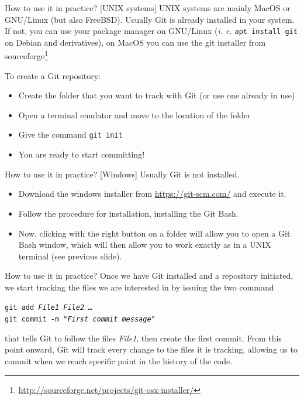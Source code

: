 \documentclass{beamer}
\newcommand{\git}{Git{}}
\newcommand{\cd}[1]{\texttt{#1}}
\begin{document}
\begin{frame}{How to use it in practice? [UNIX systems]}
    UNIX systems are mainly MacOS or GNU/Linux (but also FreeBSD). Usually \git{} is already installed in your system. If not, you can use your package manager on GNU/Linux (\emph{i. e.} \cd{apt install git} on Debian and derivatives), on MacOS you can use the git installer from sourceforge\footnote{\url{http://sourceforge.net/projects/git-osx-installer/}}
    \begin{block}{To create a \git{} repository:}
        \begin{itemize}
        \justifying
            \item Create the folder that you want to track with \git{} (or use one already in use)
            \item Open a terminal emulator and move to the location of the folder
            \item Give the command \cd{git init}
            \item You are ready to start committing!
        \end{itemize}
    \end{block}
\end{frame}

\begin{frame}{How to use it in practice? [Windows]}
    Usually \git{} is not installed. 
    \begin{itemize}
    \justifying
        \item Download the windows installer from \url{https://git-scm.com/} and execute it.
        \item Follow the procedure for installation, installing the Git Bash.
        \item Now, clicking with the right button on a folder will allow you to open a Git Bash window, which will then allow you to work exactly as in a UNIX terminal (see previous slide).
    \end{itemize}
\end{frame}

\begin{frame}{How to use it in practice?}
    Once we have \git{} installed and a repository initiated, we start tracking the files we are interested in by issuing the two command 
    \begin{flushleft}
        \cd{git add \textit{File1} \textit{File2} \textit{\dots}}\\
        \cd{git commit -m \textit{"First commit message"}}
    \end{flushleft}
    that tells \git{} to follow the files \textit{File1}, then create the first commit. From this point onward, \git{} will track every change to the files it is tracking, allowing us to commit when we reach specific point in the history of the code.
\end{frame}
\end{document}
